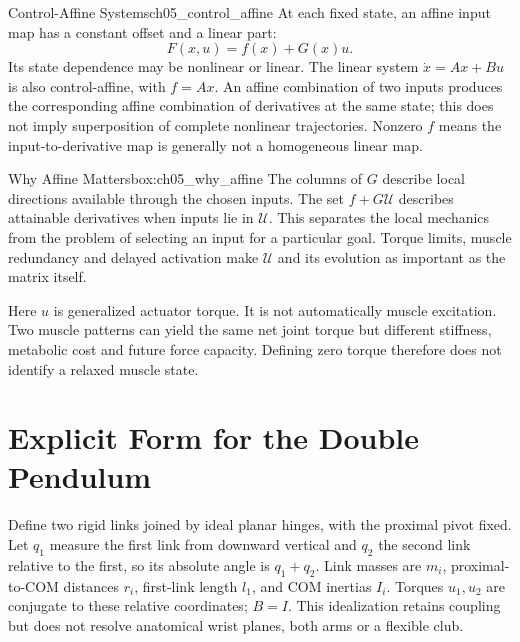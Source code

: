 \begin{definition}{Control-Affine Systems}{ch05_control_affine}
At each fixed state, an affine input map has a constant offset and a linear part:
\begin{equation}
 F(x,u)=f(x)+G(x)u.
\label{eq:ch05_control_affine_def}
\end{equation}
Its state dependence may be nonlinear or linear. The linear system $\dot x=Ax+Bu$ is also control-affine, with $f=Ax$. An affine combination of two inputs produces the corresponding affine combination of derivatives at the same state; this does not imply superposition of complete nonlinear trajectories. Nonzero $f$ means the input-to-derivative map is generally not a homogeneous linear map.
\end{definition}

\begin{laymansbox}{Why Affine Matters}{box:ch05_why_affine}
The columns of $G$ describe local directions available through the chosen inputs. The set $f+G\mathcal U$ describes attainable derivatives when inputs lie in $\mathcal U$. This separates the local mechanics from the problem of selecting an input for a particular goal. Torque limits, muscle redundancy and delayed activation make $\mathcal U$ and its evolution as important as the matrix itself.

Here $u$ is generalized actuator torque. It is not automatically muscle excitation. Two muscle patterns can yield the same net joint torque but different stiffness, metabolic cost and future force capacity. Defining zero torque therefore does not identify a relaxed muscle state.
\end{laymansbox}

\section{Explicit Form for the Double Pendulum}
Define two rigid links joined by ideal planar hinges, with the proximal pivot fixed. Let $q_1$ measure the first link from downward vertical and $q_2$ the second link relative to the first, so its absolute angle is $q_1+q_2$. Link masses are $m_i$, proximal-to-COM distances $r_i$, first-link length $l_1$, and COM inertias $I_i$. Torques $u_1,u_2$ are conjugate to these relative coordinates; $B=I$. This idealization retains coupling but does not resolve anatomical wrist planes, both arms or a flexible club.

